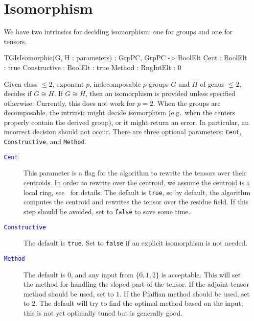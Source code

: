 \documentclass{documentation}
\begin{document}
\chapter{Isomorphism}

We have two intrinsics for deciding isomorphism: one for groups and one for tensors. 

\begin{intrinsics}
TGIsIsomorphic(G, H : parameters) : GrpPC, GrpPC -> BoolElt
    Cent : BoolElt : true
    Constructive : BoolElt : true
    Method : RngIntElt : 0
\end{intrinsics}

Given class $\leq 2$, exponent $p$, indecomposable $p$-groups $G$ and $H$ of genus $\leq 2$, decides if $G\cong H$.
If $G\cong H$, then an isomorphism is provided unless specified otherwise.
Currently, this does not work for $p=2$. When the groups are decomposable, the intrinsic might decide isomorphism (e.g.\ when the centers properly contain the derived group), or it might return an error. In particular, an incorrect decision should not occur.  
There are three optional parameters: \texttt{Cent}, \texttt{Constructive}, and \texttt{Method}.

\begin{description}
\item[\textcolor{blue}{\tt Cent}]
This parameter is a flag for the algorithm to rewrite the tensors over their centroids. In order to rewrite over the centroid, we assume the centroid is a local ring, see~\cite{TensorSpacePackage} for details. The default is \texttt{true}, so by default, the algorithm computes the centroid and rewrites the tensor over the residue field.
If this step should be avoided, set to \texttt{false} to save some time.
\item[\textcolor{blue}{\tt Constructive}]
The default is \texttt{true}. 
Set to \texttt{false} if an explicit isomorphism is not needed.
\item[\textcolor{blue}{\tt Method}]
The default is $0$, and any input from $\{ 0,1,2\}$ is acceptable. 
This will set the method for handling the sloped part of the tensor.
If the adjoint-tensor method should be used, set to $1$. If the Pfaffian method should be used, set to $2$. The default will try to find the optimal method based on the input; this is not yet optimally tuned but is generally good.
\end{description}
\end{document}
